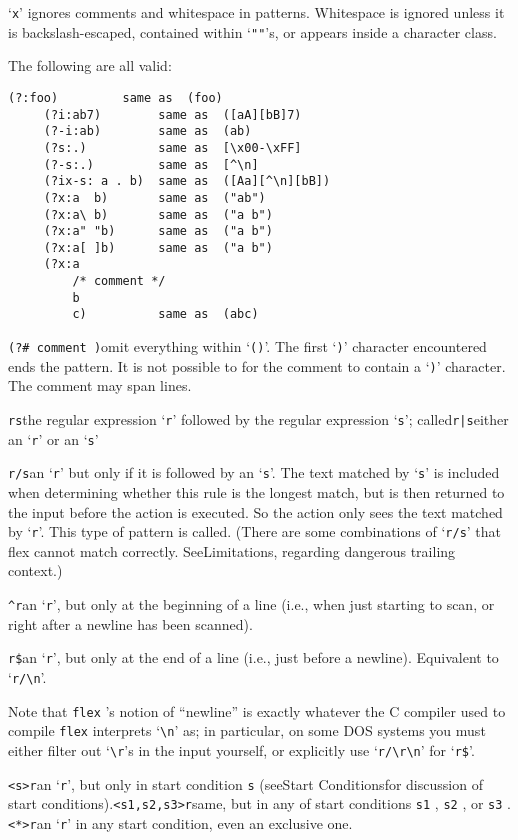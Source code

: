 \documentclass[openany,oneside]{book}
\begin{document}
‘\verb`x`’ ignores comments and whitespace in patterns. Whitespace is ignored unless
it is backslash-escaped, contained within ‘\verb`""`’s, or appears inside a
character class.

The following are all valid:
\begin{verbatim}
(?:foo)         same as  (foo)
     (?i:ab7)        same as  ([aA][bB]7)
     (?-i:ab)        same as  (ab)
     (?s:.)          same as  [\x00-\xFF]
     (?-s:.)         same as  [^\n]
     (?ix-s: a . b)  same as  ([Aa][^\n][bB])
     (?x:a  b)       same as  ("ab")
     (?x:a\ b)       same as  ("a b")
     (?x:a" "b)      same as  ("a b")
     (?x:a[ ]b)      same as  ("a b")
     (?x:a
         /* comment */
         b
         c)          same as  (abc)
\end{verbatim}
\verb`(?# comment )`omit everything within ‘\verb`()`’. The first ‘\verb`)`’
character encountered ends the pattern. It is not possible to for the comment
to contain a ‘\verb`)`’ character. The comment may span lines.

\verb`rs`the regular expression ‘\verb`r`’ followed by the regular expression ‘\verb`s`’; called\verb`r|s`either an ‘\verb`r`’ or an ‘\verb`s`’

\verb`r/s`an ‘\verb`r`’ but only if it is followed by an ‘\verb`s`’.  The text matched by ‘\verb`s`’ is
included when determining whether this rule is the longest match, but is
then returned to the input before the action is executed.  So the action
only sees the text matched by ‘\verb`r`’.  This type of pattern is called.  (There are some combinations of ‘\verb`r/s`’ that flex
cannot match correctly. SeeLimitations, regarding dangerous trailing
context.)

\verb`^r`an ‘\verb`r`’, but only at the beginning of a line (i.e.,
when just starting to scan, or right after a
newline has been scanned).

\verb`r$`an ‘\verb`r`’, but only at the end of a line (i.e., just before a
newline).  Equivalent to ‘\verb`r/\n`’.

Note that \verb`flex` 's notion of “newline” is exactly
whatever the C compiler used to compile \verb`flex` interprets ‘\verb`\n`’ as; in particular, on some DOS
systems you must either filter out ‘\verb`\r`’s in the
input yourself, or explicitly use ‘\verb`r/\r\n`’ for ‘\verb`r$`’.

\verb`<s>r`an ‘\verb`r`’, but only in start condition \verb`s` (seeStart Conditionsfor discussion of start conditions).\verb`<s1,s2,s3>r`same, but in any of start conditions \verb`s1` , \verb`s2` , or \verb`s3` .\verb`<*>r`an ‘\verb`r`’ in any start condition, even an exclusive one.
\end{document}
